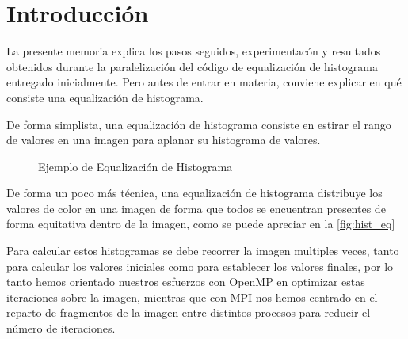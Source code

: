 \documentclass[12pt]{report} %
\begin{document}
\listoffigures
\thispagestyle{fancy}

\listoftables
\thispagestyle{fancy}

\clearpage
{} %

\chapter{Introducción}
\label{chap:Intro}

La presente memoria explica los pasos seguidos, experimentacón y resultados obtenidos durante la
paralelización del código de equalización de histograma entregado inicialmente. Pero antes de entrar
en materia, conviene explicar en qué consiste una equalización de histograma.

De forma simplista, una equalización de histograma consiste en estirar el rango de valores en una
imagen para aplanar su histograma de valores.

\begin{figure}[H]
    \caption{Ejemplo de Equalización de Histograma}
    \label{fig:hist_eq}
\end{figure}

De forma un poco más técnica, una equalización de histograma distribuye los valores de color en una imagen de
forma que todos se encuentran presentes de forma equitativa dentro de la imagen, como se puede apreciar
en la \autoref{fig:hist_eq}

Para calcular estos histogramas se debe recorrer la imagen multiples veces, tanto para
calcular los valores iniciales como para establecer los valores finales, por lo tanto hemos orientado
nuestros esfuerzos con OpenMP \parencite{timlewis_openmp_nodate} en optimizar estas iteraciones sobre
la imagen, mientras que con MPI \parencite{noauthor_open_nodate} nos hemos centrado en el reparto
de fragmentos de la imagen entre distintos procesos para reducir el número de iteraciones.
\end{document}
